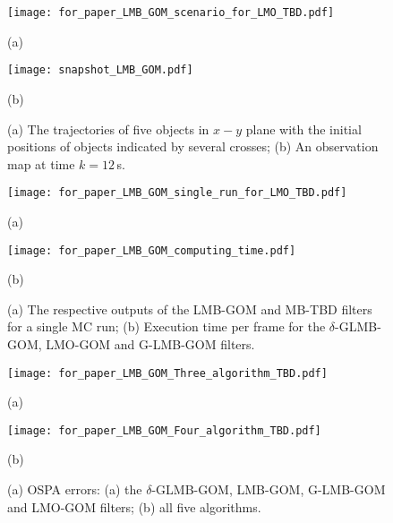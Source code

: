 \documentclass[journal]{IEEEtran}
\begin{document}
{   \begin{figure}[ht]
\setlength{\abovecaptionskip}{-7pt}
\setlength{\belowcaptionskip}{-7pt}
\begin{minipage}[b]{0.48\linewidth}
  \centering
\centerline{\texttt{[image: for\_paper\_LMB\_GOM\_scenario\_for\_LMO\_TBD.pdf]}}
\centerline{\small{\small{(a)}} }\medskip
\end{minipage}
\hfill
\begin{minipage}[b]{0.48\linewidth}
  \centering
  \centerline{\texttt{[image: snapshot\_LMB\_GOM.pdf]}}
\centerline{\small{\small{(b)}}}\medskip
\end{minipage}
\caption{(a) The trajectories of five objects in $x-y$ plane with the initial positions of objects indicated by several crosses; (b) An observation map  at time $k=12$\,s.\label{fig: scenario and observation map}}
\end{figure}
\begin{figure}[ht]
\begin{minipage}[b]{0.49\linewidth}
  \centering
\centerline{\texttt{[image: for\_paper\_LMB\_GOM\_single\_run\_for\_LMO\_TBD.pdf]}}
\centerline{\small{\small{(a)}} }\medskip
\end{minipage}
\hfill
\begin{minipage}[b]{0.49\linewidth}
  \centering
\centerline{\texttt{[image: for\_paper\_LMB\_GOM\_computing\_time.pdf]}}
\centerline{\small{\small{(b)}}}\medskip
\end{minipage}
\caption{ (a) The respective outputs   of the LMB-GOM and MB-TBD filters for a single MC run; (b)  Execution time per frame for the $\delta$-GLMB-GOM, LMO-GOM and G-LMB-GOM filters.\label{fig: computing time and single-run output}}
\end{figure}
   \begin{figure}[ht]
\setlength{\abovecaptionskip}{-7pt}
\setlength{\belowcaptionskip}{-7pt}
\begin{minipage}[b]{0.48\linewidth}
  \centering
\centerline{\texttt{[image: for\_paper\_LMB\_GOM\_Three\_algorithm\_TBD.pdf]}}
\centerline{\small{\small{(a)}} }\medskip
\end{minipage}
\hfill
\begin{minipage}[b]{0.48\linewidth}
  \centering
\centerline{\texttt{[image: for\_paper\_LMB\_GOM\_Four\_algorithm\_TBD.pdf]}}
\centerline{\small{\small{(b)}}}\medskip
\end{minipage}
\caption{(a) OSPA errors: (a) the $\delta$-GLMB-GOM, LMB-GOM, G-LMB-GOM and LMO-GOM filters; (b) all five algorithms.}
  \label{fig: performance of five targets}
\end{figure}

}
\end{document}

